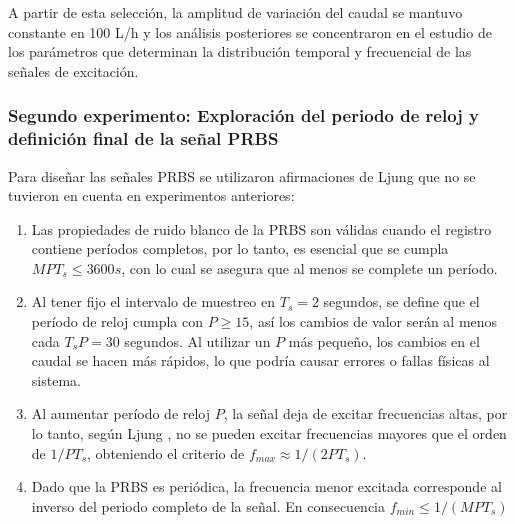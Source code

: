 \documentclass[11pt]{report}
\begin{document}
A partir de esta selección, la amplitud de variación del caudal se mantuvo constante en 100 L/h y los análisis posteriores se concentraron en el estudio de los parámetros que determinan la distribución temporal y frecuencial de las señales de excitación.







\subsubsection{Segundo experimento: Exploración del periodo de reloj y definición final de la señal PRBS}
Para diseñar las señales PRBS se utilizaron afirmaciones de Ljung \cite{ljung1999system} que no se tuvieron en cuenta en experimentos anteriores:
\begin{enumerate}[label=\roman*)]
    \item Las propiedades de ruido blanco de la PRBS son válidas cuando el registro contiene períodos completos, por lo tanto, es esencial que se cumpla $MPT_s\leq3600s$, con lo cual se asegura que al menos se complete un período.
    \item Al tener fijo el intervalo de muestreo en $T_s=2 $ segundos, se define que el período de reloj cumpla con $P\geq15$, así los cambios de valor serán al menos cada $T_sP=30$ segundos. Al utilizar un $P$ más pequeño, los cambios en el caudal se hacen más rápidos, lo que podría causar errores o fallas físicas al sistema.
    \item Al aumentar período de reloj $P$, la señal deja de excitar frecuencias altas, por lo tanto, según Ljung \cite{ljung1999system}, no se pueden excitar frecuencias mayores que el orden de $1/PT_s$, obteniendo el criterio de $f_{max}\approx1/(2PT_s)$.
    \item Dado que la PRBS es periódica, la frecuencia menor excitada corresponde al inverso del periodo completo de la señal. En consecuencia $f_{min}\leq1/(MPT_s)$
\end{enumerate}
\end{document}
